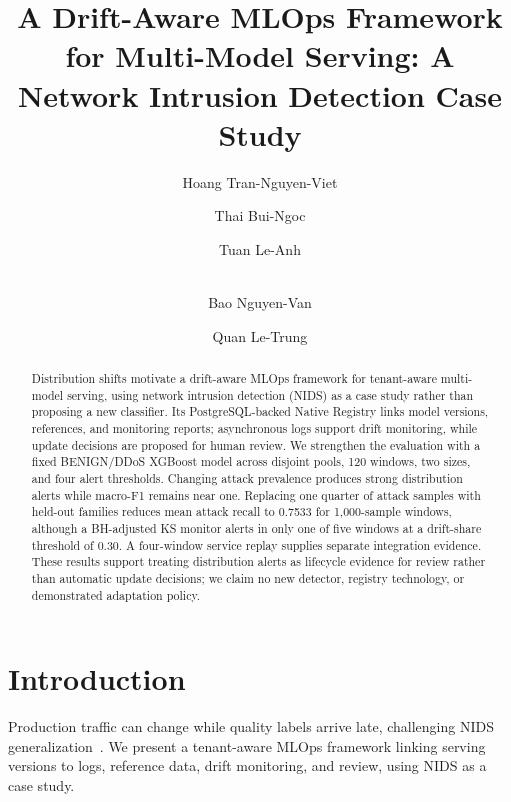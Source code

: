 \documentclass[runningheads]{llncs}
\begin{document}
\title{A Drift-Aware MLOps Framework for Multi-Model Serving: A Network Intrusion Detection Case Study}


\author{Hoang Tran-Nguyen-Viet \and
Thai Bui-Ngoc \and
Tuan Le-Anh \and \\
Bao Nguyen-Van \and
Quan Le-Trung
}



\maketitle

\begin{abstract}
Distribution shifts motivate a drift-aware MLOps framework for tenant-aware multi-model serving, using network intrusion detection (NIDS) as a case study rather than proposing a new classifier. Its PostgreSQL-backed Native Registry links model versions, references, and monitoring reports; asynchronous logs support drift monitoring, while update decisions are proposed for human review. We strengthen the evaluation with a fixed BENIGN/DDoS XGBoost model across disjoint pools, 120 windows, two sizes, and four alert thresholds. Changing attack prevalence produces strong distribution alerts while macro-F1 remains near one. Replacing one quarter of attack samples with held-out families reduces mean attack recall to 0.7533 for 1,000-sample windows, although a BH-adjusted KS monitor alerts in only one of five windows at a drift-share threshold of 0.30. A four-window service replay supplies separate integration evidence. These results support treating distribution alerts as lifecycle evidence for review rather than automatic update decisions; we claim no new detector, registry technology, or demonstrated adaptation policy.

\end{abstract}

\section{Introduction}
Production traffic can change while quality labels arrive late, challenging NIDS generalization~\cite{sommer2010closedworld}. We present a tenant-aware MLOps framework linking serving versions to logs, reference data, drift monitoring, and review, using NIDS as a case study.
\end{document}

